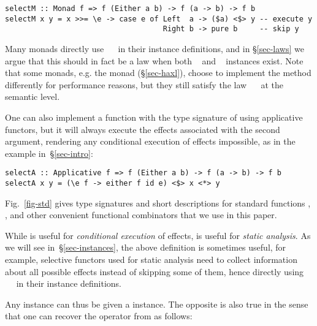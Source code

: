 \vspace{1mm}
\begin{verbatim}
selectM :: Monad f => f (Either a b) -> f (a -> b) -> f b
selectM x y = x >>= \e -> case e of Left  a -> ($a) <$> y -- execute y
                                    Right b -> pure b     -- skip y
\end{verbatim}
\vspace{1mm}

\noindent
Many monads directly use ~\hs{=}~ in their 
instance definitions, and in \S\ref{sec-laws} we argue that this should in fact
be a law when both ~ and ~ instances exist.
Note that some monads, e.g. the \Haxl monad (\S\ref{sec-haxl}), choose to
implement the   method differently for performance reasons, but they
still satisfy the law ~\hs{=}~ at the semantic level.

One can also implement a function with the type signature of  using
applicative functors, but it will always execute the effects associated with the
second argument, rendering any conditional execution of effects impossible, as
in the  example in~\S\ref{sec-intro}:

\vspace{1mm}
\begin{verbatim}
selectA :: Applicative f => f (Either a b) -> f (a -> b) -> f b
selectA x y = (\e f -> either f id e) <$> x <*> y
\end{verbatim}
\vspace{1mm}

\noindent
Fig.~\ref{fig-std} gives type signatures and short descriptions for standard
functions , , and other convenient functional combinators that
we use in this paper.

While  is useful for \emph{conditional execution} of effects,
 is useful for \emph{static analysis}. As we will see
in~\S\ref{sec-instances}, the above definition is sometimes useful, for example,
selective functors used for static analysis need to collect information about
all possible effects instead of skipping some of them, hence directly using
~\hs{=}~ in their  instance definitions.

Any  instance can thus be given a  instance. The
opposite is also true in the sense that one can recover the operator \hs{<*>}
from  as follows:

